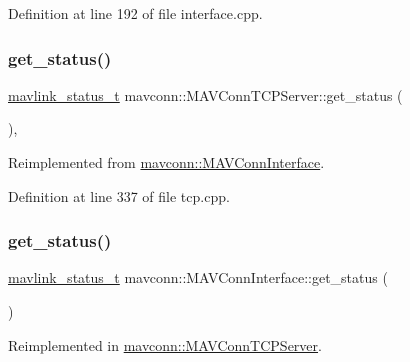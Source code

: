 Definition at line 192 of file interface.\+cpp.

\mbox{\label{group__mavconn_gab139fa8d7e65c0de256f7d9dee0d0f30}} 
\subsubsection{\texorpdfstring{get\_status()}{get\_status()}\hspace{0.1cm}{\footnotesize\ttfamily [1/2]}}
{\footnotesize\ttfamily \mbox{\hyperlink{include__v2_80_2mavlink__types_8h_aec6f7af3879252822d8fb108e97aafc2}{mavlink\+\_\+status\+\_\+t}} mavconn\+::\+M\+A\+V\+Conn\+T\+C\+P\+Server\+::get\+\_\+status (\begin{DoxyParamCaption}{ }\end{DoxyParamCaption})\hspace{0.3cm}{\ttfamily [override]}, {\ttfamily [virtual]}}



Reimplemented from \mbox{\hyperlink{group__mavconn_gaa3c7017b05ca60187122edf2ec196918}{mavconn\+::\+M\+A\+V\+Conn\+Interface}}.



Definition at line 337 of file tcp.\+cpp.

\mbox{\label{group__mavconn_gaa3c7017b05ca60187122edf2ec196918}} 
\subsubsection{\texorpdfstring{get\_status()}{get\_status()}\hspace{0.1cm}{\footnotesize\ttfamily [2/2]}}
{\footnotesize\ttfamily \mbox{\hyperlink{include__v2_80_2mavlink__types_8h_aec6f7af3879252822d8fb108e97aafc2}{mavlink\+\_\+status\+\_\+t}} mavconn\+::\+M\+A\+V\+Conn\+Interface\+::get\+\_\+status (\begin{DoxyParamCaption}{ }\end{DoxyParamCaption})\hspace{0.3cm}{\ttfamily [virtual]}}



Reimplemented in \mbox{\hyperlink{group__mavconn_gab139fa8d7e65c0de256f7d9dee0d0f30}{mavconn\+::\+M\+A\+V\+Conn\+T\+C\+P\+Server}}.



